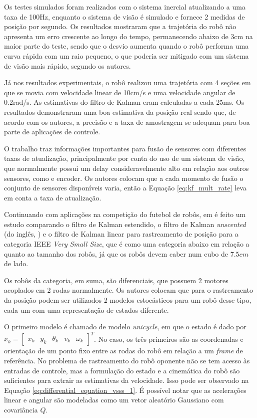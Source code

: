\documentclass[acronym, symbols, table, deposito]{fei}
\begin{document}
Os testes simulados foram realizados com o sistema inercial atualizando a uma taxa de 100Hz, enquanto o sistema de visão é simulado e fornece 2 medidas de posição por segundo. Os resultados mostraram que a trajetória do robô não apresenta um erro crescente ao longo do tempo, permanecendo abaixo de 3cm na maior parte do teste, sendo que o desvio aumenta quando o robô performa uma curva rápida com um raio pequeno, o que poderia ser mitigado com um sistema de visão mais rápido, segundo os autores.

Já nos resultados experimentais, o robô realizou uma trajetória com 4 seções em que se movia com velocidade linear de 10cm/s e uma velocidade angular de 0.2rad/s. As estimativas do filtro de Kalman eram calculadas a cada 25ms. Os resultados demonstraram uma boa estimativa da posição real sendo que, de acordo com os autores, a precisão e a taxa de amostragem se adequam para boa parte de aplicações de controle.

O trabalho traz informações importantes para fusão de sensores com diferentes taxas de atualização, principalmente por conta do uso de um sistema de visão, que normalmente possui um delay consideravelmente alto em relação aos outros sensores, como  e encoder. Os autores colocam que a cada momento de fusão o conjunto de sensores disponíveis varia, então a Equação \eqref{eq:kf_mult_rate} leva em conta a taxa de atualização.

Continuando com aplicações na competição do futebol de robôs, em \textcite{aguiar2017kalman} é feito um estudo comparando o filtro de Kalman estendido, o filtro de Kalman \textit{unscented} (do inglês, ) e o filtro de Kalman linear para rastreamento de posição para a categoria IEEE \textit{Very Small Size}, que é como uma categoria abaixo em relação a  quanto ao tamanho dos robôs, já que os robôs devem caber num cubo de $7.5cm$ de lado.

Os robôs da categoria, em suma, são diferenciais, que possuem 2 motores acoplados em 2 rodas normalmente. Os autores colocam que para o rastreamento da posição podem ser utilizados 2 modelos estocásticos para um robô desse tipo, cada um com uma representação de estados diferente. 

O primeiro modelo é chamado de modelo \textit{unicycle}, em que o estado é dado por $x_k = \begin{bmatrix}
	x_k & y_k & \theta_k & v_k & \omega_k \end{bmatrix}^T$. No caso, os três primeiros são as coordenadas e orientação de um ponto fixo entre as rodas do robô em relação a um \textit{frame} de referência. No problema de rastreamento do robô oponente não se tem acesso às entradas de controle, mas a formulação do estado e a cinemática do robô são suficientes para extrair as estimativas da velocidade. Isso pode ser observado na Equação \eqref{eq:differential_equation_vsss_1}. É possível notar que as acelerações linear e angular são modeladas como um vetor aleatório Gaussiano com covariância $Q$.
\end{document}
